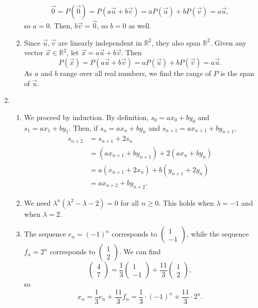 \begin{enumerate}
\begin{enumerate}
\begin{equation*}
\vec{0} = P(\vec{0}) = P(a\vec{u} + b\vec{v}) = aP(\vec{u}) + bP(\vec{v}) = a\vec{u},
\end{equation*}
so $a = 0$. Then, $b\vec{v} = \vec{0}$, so $b = 0$ as well.
\item Since $\vec{u},\vec{v}$ are linearly independent in $\mathbb{R}^2$, they also span $\mathbb{R}^2$. Given any vector $\vec{x}\in\mathbb{R}^2$, let $\vec{x} = a\vec{u} + b\vec{v}$. Then
\begin{equation*}
P(\vec{x}) = P(a\vec{u} + b\vec{v}) = aP(\vec{u}) + bP(\vec{v}) = a\vec{u}.
\end{equation*}
As $a$ and $b$ range over all real numbers, we find the range of $P$ is the span of $\vec{u}$.
\end{enumerate}
\item \begin{enumerate}
\item We proceed by induction. By definition, $s_0 = ax_0 + by_0$ and $s_1 = ax_1 + by_1$. Then, if $s_n = ax_n + by_n$ and $s_{n + 1} = ax_{n + 1} + by_{n + 1}$,
\begin{align*}
s_{n + 2} &= s_{n + 1} + 2s_n \\
&= (ax_{n + 1} + by_{n + 1}) + 2(ax_n + by_n) \\
&= a(x_{n + 1} + 2x_n) + b(y_{n + 1} + 2y_n) \\
&= ax_{n + 2} + by_{n + 2}.
\end{align*}
\item We need $\lambda^n(\lambda^2 - \lambda - 2) = 0$ for all $n\geq 0$. This holds when $\lambda = -1$ and when $\lambda = 2$.
\item The sequence $e_n = (-1)^n$ corresponds to $\begin{pmatrix} 1 \\ -1 \end{pmatrix}$, while the sequence $f_n = 2^n$ corresponds to $\begin{pmatrix} 1 \\ 2 \end{pmatrix}$. We can find
\begin{equation*}
\begin{pmatrix} 4 \\ 7 \end{pmatrix} = \frac{1}{3}\begin{pmatrix} 1 \\ -1 \end{pmatrix} + \frac{11}{3}\begin{pmatrix} 1 \\ 2 \end{pmatrix},
\end{equation*}
so
\begin{equation*}
x_n = \frac{1}{3}e_n + \frac{11}{3}f_n = \frac{1}{3}\cdot (-1)^n + \frac{11}{3}\cdot 2^n.
\end{equation*}
\end{enumerate}
\end{enumerate}